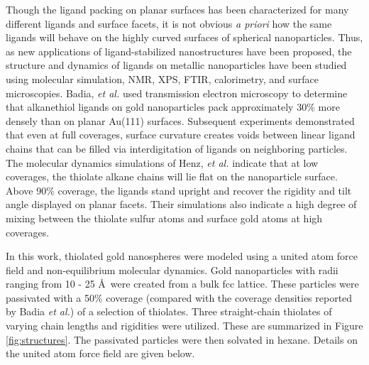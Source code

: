 Though the ligand packing on planar surfaces has been characterized
for many different ligands and surface facets, it is not obvious
\emph{a priori} how the same ligands will behave on the highly curved
surfaces of spherical nanoparticles. Thus, as new applications of
ligand-stabilized nanostructures have been proposed, the structure and
dynamics of ligands on metallic nanoparticles have been studied using
molecular simulation,\cite{Henz:2008qf} NMR, XPS, FTIR,
calorimetry, and surface
microscopies.\cite{Badia1996:2,Badia1996,Badia1997:2,Badia1997,Badia2000}
Badia, \textit{et al.} used transmission electron microscopy to
determine that alkanethiol ligands on gold nanoparticles pack
approximately 30\% more densely than on planar Au(111)
surfaces.\cite{Badia1996:2} Subsequent experiments demonstrated that
even at full coverages, surface curvature creates voids between linear
ligand chains that can be filled via interdigitation of ligands on
neighboring particles.\cite{Badia1996} The molecular dynamics
simulations of Henz, \textit{et al.} indicate that at low coverages,
the thiolate alkane chains will lie flat on the nanoparticle
surface.\cite{Henz:2008qf} Above 90\% coverage, the ligands
stand upright and recover the rigidity and tilt angle displayed on
planar facets. Their simulations also indicate a high degree of mixing
between the thiolate sulfur atoms and surface gold atoms at high
coverages.

In this work, thiolated gold nanospheres were modeled using a united
atom force field and non-equilibrium molecular dynamics. Gold
nanoparticles with radii ranging from 10 - 25 \AA\ were created from a
bulk fcc lattice.  These particles were passivated with a 50\%
coverage (compared with the coverage densities reported by Badia
\textit{et al.}) of a selection of thiolates.  Three straight-chain
thiolates of varying chain lengths and rigidities were utilized.
These are summarized in Figure \ref{fig:structures}.  The passivated
particles were then solvated in hexane.  Details on the united atom
force field are given below.

